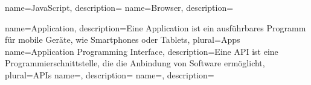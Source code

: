 
{
	name=JavaScript,
	description={}
}
{
	name=Browser,
	description={}
}

{
	name=Application,
	description={Eine Application ist ein ausführbares Programm für mobile Geräte, wie Smartphones oder Tablets},
	plural=Apps
}
{
	name=Application Programming Interface,
	description={Eine API ist eine Programmierschnittstelle, die die Anbindung von Software ermöglicht},
	plural=APIs
}
{
	name=,
	description={}
}
{
	name=,
	description={}
}
